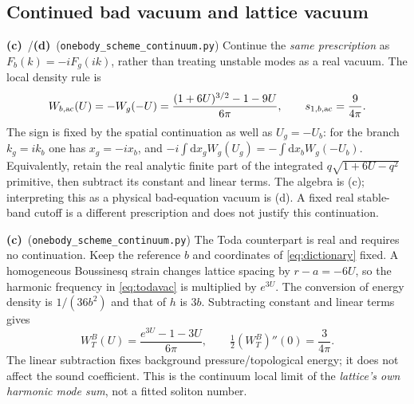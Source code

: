 \documentclass[11pt,a4paper]{article}
\newcommand{\Lc}{\textbf{(c)}\ }
\newcommand{\Ld}{\textbf{(d)}\ }
\newcommand{\dd}{\mathrm d}
\newcommand{\ccheck}{\texttt{onebody\_\allowbreak scheme\_\allowbreak continuum.py}}
\begin{document}
\subsection{Continued bad vacuum and lattice vacuum}
\Lc/\Ld (\ccheck) Continue the \emph{same prescription} as
$F_b(k)=-iF_g(ik)$, rather than treating unstable modes as a real vacuum.
The local density rule is
\begin{equation}\label{eq:Wb}
 W_{b,\rm ac}(U)=-W_g(-U)
  =\frac{(1+6U)^{3/2}-1-9U}{6\pi},\qquad
 s_{1,b,\rm ac}=\frac9{4\pi}.
\end{equation}
The sign is fixed by the spatial continuation as well as $U_g=-U_b$:
for the branch $k_g=ik_b$ one has $x_g=-ix_b$, and
$-i\int\dd x_g W_g(U_g)=-\int\dd x_b W_g(-U_b)$.
Equivalently, retain the real analytic finite part of the integrated
$q\sqrt{1+6U-q^2}$ primitive, then subtract its constant and linear terms.
The algebra is (c); interpreting this as a physical bad-equation vacuum
is (d). A fixed real stable-band cutoff is a different prescription and
does not justify this continuation.

\Lc (\ccheck) The Toda counterpart is real and requires no continuation.
Keep the reference $b$ and coordinates of \eqref{eq:dictionary} fixed.
A homogeneous Boussinesq strain changes lattice spacing by
$r-a=-6U$, so the harmonic frequency in \eqref{eq:todavac} is multiplied
by $e^{3U}$. The conversion of energy density is $1/(36b^2)$ and that
of $h$ is $3b$. Subtracting constant and linear terms gives
\begin{equation}\label{eq:WT}
 W_T^{B}(U)=\frac{e^{3U}-1-3U}{6\pi},\qquad
 \tfrac12(W_T^{B})''(0)=\frac3{4\pi}.
\end{equation}
The linear subtraction fixes background pressure/topological energy; it
does not affect the sound coefficient. This is the continuum local limit
of the \emph{lattice's own harmonic mode sum}, not a fitted soliton number.
\end{document}
